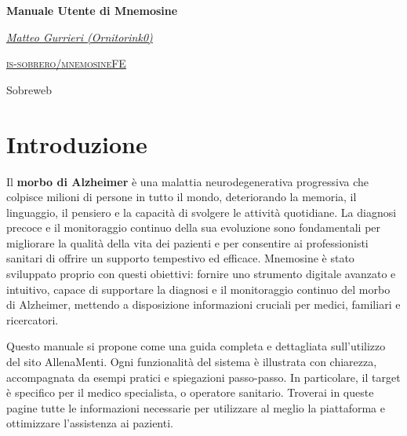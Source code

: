 \documentclass[a4paper,12pt]{book}
\begin{document}
	
	\begin{titlepage}
		\centering
		\vspace*{3cm}
		
		{\Huge \textbf{Manuale Utente di Mnemosine}\par}
		
		\vspace{2cm}
		
		{\Large\itshape {\href{https://github.com/Ornitorink0}{Matteo Gurrieri (Ornitorink0)}}\par}
		
		\vfill
		
		\textsc{\href{https://github.com/is-sobrero/mnemosineFE}{is-sobrero/mnemosineFE}}
		
		\vspace{1cm}
		
		{\large Sobreweb\par}
	\end{titlepage}
	
	\tableofcontents %
	
	\chapter{Introduzione}
	Il \textbf{morbo di Alzheimer} è una malattia neurodegenerativa progressiva che colpisce milioni di persone in tutto il mondo, deteriorando la memoria, il linguaggio, il pensiero e la capacità di svolgere le attività quotidiane. La diagnosi precoce e il monitoraggio continuo della sua evoluzione sono fondamentali per migliorare la qualità della vita dei pazienti e per consentire ai professionisti sanitari di offrire un supporto tempestivo ed efficace. Mnemosine è stato sviluppato proprio con questi obiettivi: fornire uno strumento digitale avanzato e intuitivo, capace di supportare la diagnosi e il monitoraggio continuo del morbo di Alzheimer, mettendo a disposizione informazioni cruciali per medici, familiari e ricercatori.
	
	Questo manuale si propone come una guida completa e dettagliata sull’utilizzo del sito AllenaMenti. Ogni funzionalità del sistema è illustrata con chiarezza, accompagnata da esempi pratici e spiegazioni passo-passo. In particolare, il target è specifico per il medico specialista, o operatore sanitario. Troverai in queste pagine tutte le informazioni necessarie per utilizzare al meglio la piattaforma e ottimizzare l’assistenza ai pazienti.
	
\end{document}

